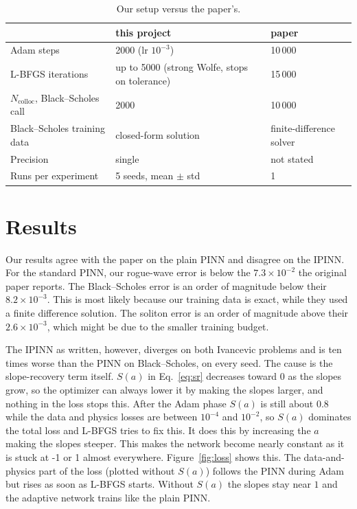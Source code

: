 \documentclass[10pt]{article}
\begin{document}
\begin{table}[H]
  \centering
  \caption{Our setup versus the paper's.}
  \label{tab:setup}
  \small
  \begin{tabular}{lll}
    \toprule
     & this project & paper \\
    \midrule
    Adam steps & 2000 (lr $10^{-3}$) & 10\,000 \\
    L-BFGS iterations & up to 5000 (strong Wolfe, stops on tolerance) & 15\,000 \\
    $N_{\text{colloc}}$, Black--Scholes call & 2000 & 10\,000 \\
    Black--Scholes training data & closed-form solution & finite-difference solver \\
    Precision & single & not stated \\
    Runs per experiment & 5 seeds, mean $\pm$ std & 1 \\
    \bottomrule
  \end{tabular}
\end{table}

\section{Results}
\label{sec:results}

\begin{table}[H]
  \centering
  \caption{Test errors, mean $\pm$ std over 5 seeds.}
  \label{tab:results}
  \small
  
\end{table}

Our results agree with the paper on the plain PINN and disagree on the IPINN. For the standard PINN, our rogue-wave error is below the $7.3\times10^{-2}$ the original paper reports.
The Black--Scholes error is an order of magnitude below their $8.2\times10^{-3}$. This is most likely because our training
data is exact, while they used a finite difference solution. The soliton error is an order of magnitude above
their $2.6\times10^{-3}$, which might be due to the smaller training budget. 

The IPINN as written, however, diverges on both Ivancevic problems and is ten times worse than the PINN
on Black--Scholes, on every seed. The cause is the slope-recovery term itself. $S(a)$ in Eq.~\eqref{eq:sr}
decreases toward $0$ as the slopes grow, so the optimizer can always lower it by making the slopes larger,
and nothing in the loss stops this. After the Adam phase $S(a)$ is still about $0.8$ while the data and
physics losses are between $10^{-4}$ and $10^{-2}$, so $S(a)$ dominates the total loss and L-BFGS tries to fix this.
It does this by increasing the $a$ making the slopes steeper. This makes the network become nearly constant as it is stuck at -1 or 1 almost everywhere.
Figure~\ref{fig:loss} shows this. The data-and-physics part of the loss (plotted without
$S(a)$) follows the PINN during Adam but rises as soon as L-BFGS starts. Without $S(a)$ the slopes stay
near $1$ and the adaptive network trains like the plain PINN.
\end{document}
